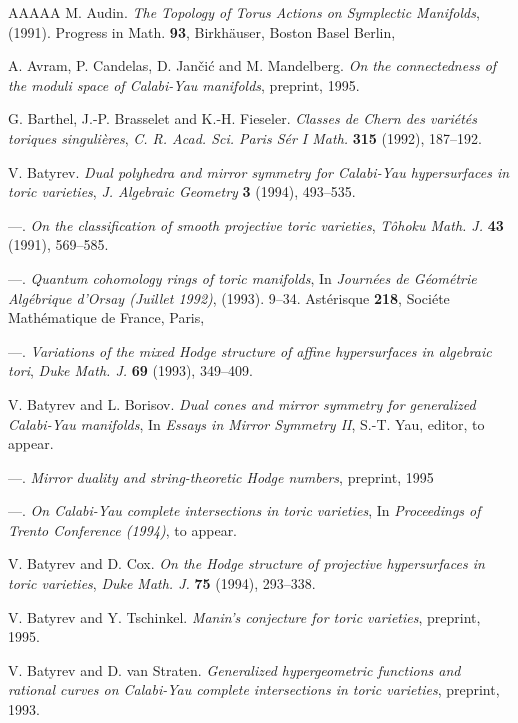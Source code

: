 \documentclass{amsart}
\theoremstyle{plain}
\theoremstyle{definition}
\begin{document}
\begin{thebibliography}{AAAAA}
M. Audin. \textit{The Topology of Torus Actions on Symplectic Manifolds}, (1991). Progress in Math. \textbf{93}, Birkh\"auser, Boston Basel Berlin,

A. Avram, P. Candelas, D. Jan\v ci\'c and M. Mandelberg. \textit{On the connectedness of the moduli space of Calabi-Yau manifolds}, preprint, 1995.

G. Barthel, J.-P. Brasselet and K.-H. Fieseler. \textit{Classes de Chern des vari\'et\'es toriques singuli\`eres}, \textit{C. R. Acad. Sci. Paris S\'er I Math.} \textbf{315} (1992), 187--192.

V. Batyrev. \textit{Dual polyhedra and mirror symmetry for Calabi-Yau hypersurfaces in toric varieties}, \textit{J. Algebraic Geometry} \textbf{3} (1994), 493--535.

---. \textit{On the classification of smooth projective toric varieties}, \textit{T\^ ohoku Math. J.} \textbf{43} (1991), 569--585.

---. \textit{Quantum cohomology rings of toric manifolds}, In \textit{Journ\'ees de G\'eom\'etrie Alg\'e\-brique d'Orsay (Juillet 1992)}, (1993). 9--34. Ast\'erisque \textbf{218}, Soci\'ete Math\'ematique de France, Paris,

---. \textit{Variations of the mixed Hodge structure of affine hypersurfaces in algebraic tori}, \textit{Duke Math. J.} \textbf{69} (1993), 349--409.

V. Batyrev and L. Borisov. \textit{Dual cones and mirror symmetry for generalized Calabi-Yau manifolds}, In \textit{Essays in Mirror Symmetry II}, S.-T. Yau, editor, to appear.

---. \textit{Mirror duality and string-theoretic Hodge numbers}, preprint, 1995 %

---. \textit{On Calabi-Yau complete intersections in toric varieties}, In \textit{Proceedings of Trento Conference (1994)}, to appear.

V. Batyrev and D. Cox. \textit{On the Hodge structure of projective hypersurfaces in toric varieties}, \textit{Duke Math. J.} \textbf{75} (1994), 293--338.

V. Batyrev and Y. Tschinkel. \textit{Manin's conjecture for toric varieties}, preprint, 1995.

V. Batyrev and D. van Straten. \textit{Generalized hypergeometric functions and rational curves on Calabi-Yau complete intersections in toric varieties}, preprint, 1993.


\end{thebibliography}
\end{document}

